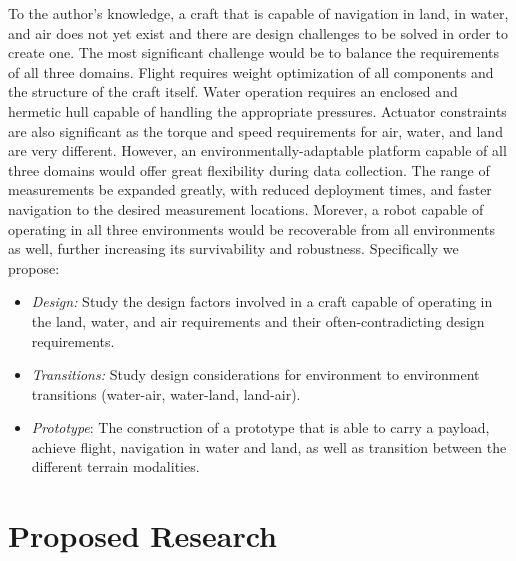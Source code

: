 To the author's knowledge, a craft that is capable of navigation in land, in water, and air does not yet exist and there are design challenges to be solved in order to create one. The most significant challenge would be to balance the requirements of all three domains. Flight requires weight optimization of all components and the structure of the craft itself.  Water operation requires an enclosed and hermetic hull capable of handling the appropriate pressures. Actuator constraints are also significant as the torque and speed requirements for air, water, and land are very different. However, an environmentally-adaptable platform capable of all three domains would offer great flexibility during data collection. The range of measurements be expanded greatly, with reduced deployment times, and faster navigation to the desired measurement locations. Morever, a robot capable of operating in all three environments would be recoverable from all environments as well, further increasing its survivability and robustness. Specifically we propose: 

\begin{itemize}
	\item \emph{Design:} Study the design factors involved in a craft capable of operating in the land, water, and air requirements and their often-contradicting design requirements. 
	\item \emph{Transitions:} Study design considerations for environment to environment transitions (water-air, water-land, land-air). 
	\item \emph{Prototype}: The construction of a prototype that is able to carry a payload, achieve flight, navigation in water and land, as well as transition between the different terrain modalities. 
\end{itemize}

\section{Proposed Research} 

